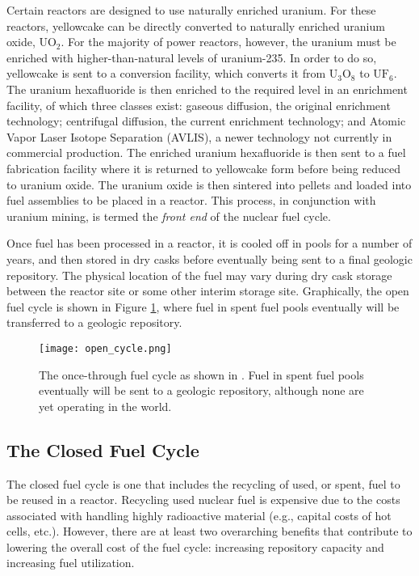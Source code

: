 Certain reactors are designed to use naturally enriched uranium. For these
reactors, yellowcake can be directly converted to naturally enriched uranium
oxide, $\mathrm{UO_2}$. For the majority of power reactors, however, the uranium
must be enriched with higher-than-natural levels of uranium-235. In order to do
so, yellowcake is sent to a conversion facility, which converts it from
$\mathrm{U_3O_8}$ to $\mathrm{UF_6}$. The uranium hexafluoride is then enriched
to the required level in an enrichment facility, of which three classes exist:
gaseous diffusion, the original enrichment technology; centrifugal diffusion,
the current enrichment technology; and Atomic Vapor Laser Isotope Separation
(AVLIS), a newer technology not currently in commercial production. The enriched
uranium hexafluoride is then sent to a fuel fabrication facility where it is
returned to yellowcake form before being reduced to uranium oxide. The uranium
oxide is then sintered into pellets and loaded into fuel assemblies to be placed
in a reactor. This process, in conjunction with uranium mining, is termed the
\textit{front end} of the nuclear fuel cycle.

Once fuel has been processed in a reactor, it is cooled off in pools for a
number of years, and then stored in dry casks before eventually being sent to a
final geologic repository. The physical location of the fuel may vary during dry
cask storage between the reactor site or some other interim storage
site. Graphically, the open fuel cycle is shown in Figure \ref{fig:open-cycle},
where fuel in spent fuel pools eventually will be transferred to a geologic
repository.

\begin{figure}[]
  \begin{center}
    \texttt{[image: open\_cycle.png]}
  \caption{The once-through fuel cycle as shown in
    \cite{cochran1990nuclear}. Fuel in spent fuel pools eventually will be sent
    to a geologic repository, although none are yet operating in the world.}
  \label{fig:open-cycle}
  \end{center}
\end{figure}

\subsection{The Closed Fuel Cycle}

The closed fuel cycle is one that includes the recycling of used, or spent, fuel
to be reused in a reactor. Recycling used nuclear fuel is expensive due to the
costs associated with handling highly radioactive material (e.g., capital costs
of hot cells, etc.). However, there are at least two overarching benefits that
contribute to lowering the overall cost of the fuel cycle: increasing repository
capacity and increasing fuel utilization.

